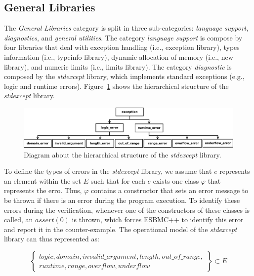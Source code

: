 \documentclass[a4paper]{llncs}
\begin{document}
\subsection{General Libraries}

The \textit{General Libraries} category is split in three
sub-categories: \textit{language support}, \textit{diagnostics},
and \textit{general utilities}. The category \textit{language support}
is compose by four libraries that deal with exception handling
(i.e., exception library), types information (i.e., typeinfo library),
dynamic allocation of memory (i.e., new library), and numeric limits
(i.e., limits library). The category \textit{diagnostic} is composed by
the \textit{stdexcept} library, which implements standard exceptions
(e.g., logic and runtime errors). Figure~\ref{figure:stdexcept}
shows the hierarchical structure of the \textit{stdexcept} library.

\begin{figure}[ht]
\centering
\includegraphics[scale=0.23]{figures/stdexcept.eps}
\caption{Diagram about the hierarchical structure of the \textit{stdexcept} library.}
\label{figure:stdexcept}
\end{figure}

To define the types of errors in the \textit{stdexcept} library, we assume that
$e$ represents an element within the set $E$ such that for each $e$ exists one class
$\varphi$ that represents the erro. Thus, $\varphi$ contains a constructor that sets an
error message to be thrown if there is an error during the program execution.
To identify these errors during the verification, whenever one of the
constructors of these classes is called, an $assert(0)$ is thrown, which forces ESBMC++ to
identify this error and report it in the counter-example. The operational model of the
\textit{stdexcept} library can thus represented as:

\begin{equation}
\label{kind-of-exceptions}
\left\{ \begin{array}{ll}
              logic, domain, invalid\_argument, length, out\_of\_range,\\ runtime, range, overflow, underflow
        \end{array} \right\} \subset E
\end{equation}
\end{document}
